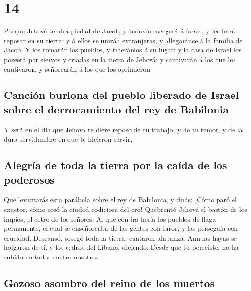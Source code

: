 \hypertarget{section-13}{%
\section{14}\label{section-13}}

 Porque Jehová tendrá piedad de Jacob, y todavía escogerá
á Israel, y les hará reposar en su tierra: y á ellos se unirán
extranjeros, y allegaránse á la familia de Jacob.  Y los
tomarán los pueblos, y traeránlos á su lugar: y la casa de Israel los
poseerá por siervos y criadas en la tierra de Jehová: y cautivarán á los
que los cautivaron, y señorearán á los que los oprimieron.

\hypertarget{canciuxf3n-burlona-del-pueblo-liberado-de-israel-sobre-el-derrocamiento-del-rey-de-babilonia}{%
\subsection{Canción burlona del pueblo liberado de Israel sobre el
derrocamiento del rey de
Babilonia}\label{canciuxf3n-burlona-del-pueblo-liberado-de-israel-sobre-el-derrocamiento-del-rey-de-babilonia}}

 Y será en el día que Jehová te diere reposo de tu
trabajo, y de tu temor, y de la dura servidumbre en que te hicieron
servir,

\hypertarget{alegruxeda-de-toda-la-tierra-por-la-cauxedda-de-los-poderosos}{%
\subsection{Alegría de toda la tierra por la caída de los
poderosos}\label{alegruxeda-de-toda-la-tierra-por-la-cauxedda-de-los-poderosos}}

 Que levantarás esta parábola sobre el rey de Babilonia, y
dirás: ¡Cómo paró el exactor, cómo cesó la ciudad codiciosa del oro!
 Quebrantó Jehová el bastón de los impíos, el cetro de los
señores;  Al que con ira hería los pueblos de llaga
permanente, el cual se enseñoreaba de las gentes con furor, y las
perseguía con crueldad.  Descansó, sosegó toda la tierra:
cantaron alabanza.  Aun las hayas se holgaron de ti, y los
cedros del Líbano, diciendo: Desde que tú pereciste, no ha subido
cortador contra nosotros.

\hypertarget{gozoso-asombro-del-reino-de-los-muertos}{%
\subsection{Gozoso asombro del reino de los
muertos}\label{gozoso-asombro-del-reino-de-los-muertos}}

